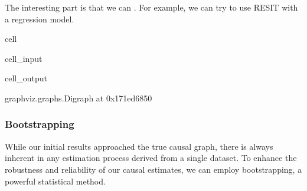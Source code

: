 \documentclass[letterpaper,10pt,english]{jupyterBook}
\begin{document}
\sphinxAtStartPar
The interesting part is that we can . For example, we can try to use RESIT with a  regression model.

\begin{sphinxuseclass}{cell}\begin{sphinxVerbatimInput}

\begin{sphinxuseclass}{cell_input}
\begin{sphinxVerbatim}[commandchars=\\\{\}]
 
   

    
  
 
\end{sphinxVerbatim}

\end{sphinxuseclass}\end{sphinxVerbatimInput}
\begin{sphinxVerbatimOutput}

\begin{sphinxuseclass}{cell_output}
\begin{sphinxVerbatim}[commandchars=\\\{\}]
\PYGZlt{}graphviz.graphs.Digraph at 0x171ed6850\PYGZgt{}
\end{sphinxVerbatim}

\end{sphinxuseclass}\end{sphinxVerbatimOutput}

\end{sphinxuseclass}

\subsubsection{Bootstrapping}
\label{\detokenize{notebooks/semiparametric_resit:bootstrapping}}
\sphinxAtStartPar
While our initial results approached the true causal graph, there is always inherent  in any estimation process derived from a single dataset. To enhance the robustness and reliability of our causal estimates, we can employ bootstrapping, a powerful statistical  method.
\end{document}
